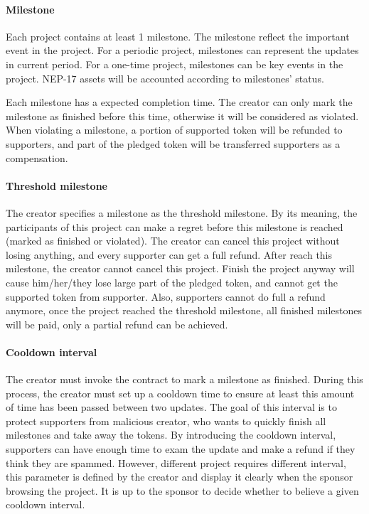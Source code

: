 \paragraph{Milestone}

Each project contains at least 1 milestone.
The milestone reflect the important event in the project.
For a periodic project, milestones can represent the updates in current period.
For a one-time project, milestones can be key events in the project.
NEP-17 assets will be accounted according to milestones' status.

Each milestone has a expected completion time.
The creator can only mark the milestone as finished before this time, otherwise
it will be considered as violated.
When violating a milestone, a portion of supported token will be refunded to supporters,
and part of the pledged token will be transferred supporters as a compensation.

\paragraph{Threshold milestone}

The creator specifies a milestone as the threshold milestone.
By its meaning, the participants of this project can make a regret before this
milestone is reached (marked as finished or violated).
The creator can cancel this project without losing anything, and every supporter
can get a full refund.
After reach this milestone, the creator cannot cancel this project.
Finish the project anyway will cause him/her/they lose large part of the pledged
token, and cannot get the supported token from supporter.
Also, supporters cannot do full a refund anymore, once the project reached the
threshold milestone, all finished milestones will be paid, only a partial refund
can be achieved.

\paragraph{Cooldown interval}

The creator must invoke the contract to mark a milestone as finished.
During this process, the creator must set up a cooldown time to ensure
at least this amount of time has been passed between two updates.
The goal of this interval is to protect supporters from malicious creator,
who wants to quickly finish all milestones and take away the tokens.
By introducing the cooldown interval, supporters can have enough time to
exam the update and make a refund if they think they are spammed.
However, different project requires different interval, this parameter is defined
by the creator and display it clearly when the sponsor browsing the project.
It is up to the sponsor to decide whether to believe a given cooldown interval.

